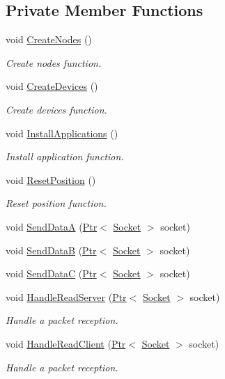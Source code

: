 \subsection*{Private Member Functions}
\begin{DoxyCompactItemize}
\item 
void \hyperlink{classHwmpDoRfRegressionTest_adde366fa993704e5bbd41166cb417b82}{Create\+Nodes} ()
\begin{DoxyCompactList}\small\item\em Create nodes function. \end{DoxyCompactList}\item 
void \hyperlink{classHwmpDoRfRegressionTest_a55abac18467e059d3c39fa0de53bc436}{Create\+Devices} ()
\begin{DoxyCompactList}\small\item\em Create devices function. \end{DoxyCompactList}\item 
void \hyperlink{classHwmpDoRfRegressionTest_abf793b52b9897879d95442b67ba1b7ec}{Install\+Applications} ()
\begin{DoxyCompactList}\small\item\em Install application function. \end{DoxyCompactList}\item 
void \hyperlink{classHwmpDoRfRegressionTest_a107845e0a26605f53b832b8a0bf78432}{Reset\+Position} ()
\begin{DoxyCompactList}\small\item\em Reset position function. \end{DoxyCompactList}\item 
void \hyperlink{classHwmpDoRfRegressionTest_a10cd000646d6a6d09d08c02d3151c9fc}{Send\+DataA} (\hyperlink{classns3_1_1Ptr}{Ptr}$<$ \hyperlink{classns3_1_1Socket}{Socket} $>$ socket)
\item 
void \hyperlink{classHwmpDoRfRegressionTest_a91c4736414815c8fd933dc2cf23146a6}{Send\+DataB} (\hyperlink{classns3_1_1Ptr}{Ptr}$<$ \hyperlink{classns3_1_1Socket}{Socket} $>$ socket)
\item 
void \hyperlink{classHwmpDoRfRegressionTest_a55d04193b7d503995b91ac3fe6aa6fa4}{Send\+DataC} (\hyperlink{classns3_1_1Ptr}{Ptr}$<$ \hyperlink{classns3_1_1Socket}{Socket} $>$ socket)
\item 
void \hyperlink{classHwmpDoRfRegressionTest_a93ecf5fdb923124fa8d7fe67b59f8673}{Handle\+Read\+Server} (\hyperlink{classns3_1_1Ptr}{Ptr}$<$ \hyperlink{classns3_1_1Socket}{Socket} $>$ socket)
\begin{DoxyCompactList}\small\item\em Handle a packet reception. \end{DoxyCompactList}\item 
void \hyperlink{classHwmpDoRfRegressionTest_a1834bb93146b264bf720a466262c0995}{Handle\+Read\+Client} (\hyperlink{classns3_1_1Ptr}{Ptr}$<$ \hyperlink{classns3_1_1Socket}{Socket} $>$ socket)
\begin{DoxyCompactList}\small\item\em Handle a packet reception. \end{DoxyCompactList}\end{DoxyCompactItemize}
